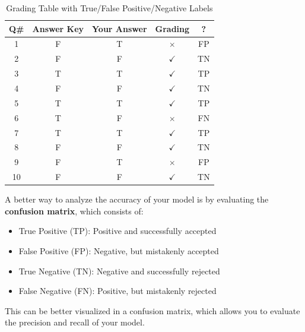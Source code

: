\documentclass{article}
\begin{document}
\begin{center}
\begin{table}[H]
\centering
\renewcommand{\arraystretch}{1.5}
\setlength{\arrayrulewidth}{0.5mm}
\setlength{\tabcolsep}{12pt}
\begin{tabular}{|c|c|c|c|c|}
\hline
\rowcolor[HTML]{D4AF37} %
\textbf{Q\#} & \textbf{Answer Key} & \textbf{Your Answer} & \textbf{Grading} & \textbf{?} \\ \hline
1 & F & T & $\times$ & FP \\ \hline
2 & F & F & $\checkmark$ & TN \\ \hline
3 & T & T & $\checkmark$ & TP \\ \hline
4 & F & F & $\checkmark$ & TN \\ \hline
5 & T & T & $\checkmark$ & TP \\ \hline
6 & T & F & $\times$ & FN \\ \hline
7 & T & T & $\checkmark$ & TP \\ \hline
8 & F & F & $\checkmark$ & TN \\ \hline
9 & F & T & $\times$ & FP \\ \hline
10 & F & F & $\checkmark$ & TN \\ \hline
\end{tabular}
\caption{Grading Table with True/False Positive/Negative Labels}

\end{table}
\vspace*{-\baselineskip}
\end{center}
A better way to analyze the accuracy of your model is by evaluating the \textbf{confusion matrix}, which consists of:
\begin{itemize}
    \item True Positive (TP): Positive and successfully accepted
    \item False Positive (FP): Negative, but mistakenly accepted
    \item True Negative (TN): Negative and successfully rejected
    \item False Negative (FN): Positive, but mistakenly rejected 
\end{itemize}
This can be better visualized in a confusion matrix, which allows you to evaluate the precision and recall of your model.
\end{document}
